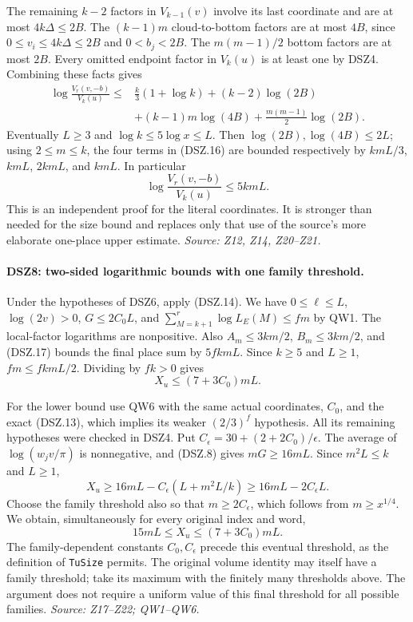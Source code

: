 The remaining $k-2$ factors in $V_{k-1}(v)$ involve its last
coordinate and are at most $4k\Delta\le2B$.
The $(k-1)m$ cloud-to-bottom factors are at most $4B$, since
$0\le v_i\le4k\Delta\le2B$ and $0<b_j<2B$.
The $m(m-1)/2$ bottom factors are at most $2B$.
Every omitted endpoint factor in $V_k(u)$ is at least one by
DSZ4. Combining these facts gives
\begin{align*}
 \log\frac{V_r(v,-b)}{V_k(u)}
 \le{}&\frac{k}{3}(1+\log k)+(k-2)\log(2B)\\
     &+(k-1)m\log(4B)+\frac{m(m-1)}2\log(2B).
                                                               \tag{DSZ.16}
\end{align*}
Eventually $L\ge3$ and $\log k\le5\log x\le L$.
Then $\log(2B),\log(4B)\le2L$; using $2\le m\le k$,
the four terms in (DSZ.16) are bounded respectively by
$kmL/3$, $kmL$, $2kmL$, and $kmL$. In particular
\[
                 \log\frac{V_r(v,-b)}{V_k(u)}\le5kmL.
                                                               \tag{DSZ.17}
\]
This is an independent proof for the literal coordinates. It is
stronger than needed for the size bound and replaces only that
use of the source's more elaborate one-place upper estimate.
\emph{Source: Z12, Z14, Z20--Z21.}

\paragraph{DSZ8: two-sided logarithmic bounds with one family threshold.}
\label{claim:DSZ8}
Under the hypotheses of DSZ6, apply (DSZ.14).
We have $0\le\ell\le L$, $\log(2v)>0$, $G\le2C_0L$,
and $\sum_{M=k+1}^r\log L_E(M)\le fm$ by QW1.
The local-factor logarithms are nonpositive.
Also $A_m\le3km/2$, $B_m\le3km/2$, and (DSZ.17) bounds
the final place sum by $5fkmL$. Since $k\ge5$ and $L\ge1$,
$fm\le fkmL/2$. Dividing by $fk>0$ gives
\[
                         X_u\le(7+3C_0)mL.                   \tag{DSZ.18}
\]

For the lower bound use QW6 with the same actual coordinates,
$C_0$, and the exact (DSZ.13), which implies its weaker
$(2/3)^f$ hypothesis. All its remaining hypotheses were checked
in DSZ4. Put
$C_\epsilon=30+(2+2C_0)/\epsilon$.
The average of $\log(w_jv/\pi)$ is nonnegative, and (DSZ.8)
gives $mG\ge16mL$. Since $m^2L\le k$ and $L\ge1$,
\[
 X_u\ge16mL-C_\epsilon(L+m^2L/k)
       \ge16mL-2C_\epsilon L.
\]
Choose the family threshold also so that $m\ge2C_\epsilon$,
which follows from $m\ge x^{1/4}$. We obtain, simultaneously
for every original index and word,
\[
                    15mL\le X_u\le(7+3C_0)mL.                \tag{DSZ.19}
\]
The family-dependent constants $C_0,C_\epsilon$ precede this
eventual threshold, as the definition of \texttt{TuSize} permits.
The original volume identity may itself have a family threshold;
take its maximum with the finitely many thresholds above.
The argument does not require a uniform value of this final
threshold for all possible families.
\emph{Source: Z17--Z22; QW1--QW6.}

